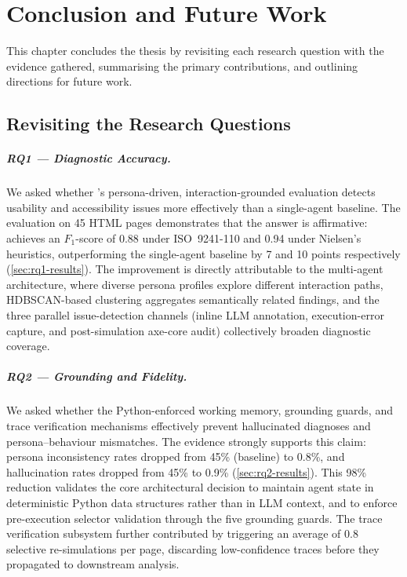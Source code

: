 \chapter{Conclusion and Future Work}
\label{ch:conclusion}

This chapter concludes the thesis by revisiting each research question with the evidence gathered, summarising the primary contributions, and outlining directions for future work.


\section{Revisiting the Research Questions}
\label{sec:rq-revisit}

\paragraph{RQ1 --- Diagnostic Accuracy.}
We asked whether \versimux{}'s persona-driven, interaction-grounded evaluation detects usability and accessibility issues more effectively than a single-agent baseline. The evaluation on 45 HTML pages demonstrates that the answer is affirmative: \versimux{} achieves an $F_1$-score of 0.88 under ISO~9241-110 and 0.94 under Nielsen's heuristics, outperforming the single-agent baseline by 7 and 10 points respectively (\cref{sec:rq1-results}). The improvement is directly attributable to the multi-agent architecture, where diverse persona profiles explore different interaction paths, HDBSCAN-based clustering aggregates semantically related findings, and the three parallel issue-detection channels (inline LLM annotation, execution-error capture, and post-simulation axe-core audit) collectively broaden diagnostic coverage.

\paragraph{RQ2 --- Grounding and Fidelity.}
We asked whether the Python-enforced working memory, grounding guards, and trace verification mechanisms effectively prevent hallucinated diagnoses and persona--behaviour mismatches. The evidence strongly supports this claim: persona inconsistency rates dropped from 45\% (baseline) to 0.8\%, and hallucination rates dropped from 45\% to 0.9\% (\cref{sec:rq2-results}). This 98\% reduction validates the core architectural decision to maintain agent state in deterministic Python data structures rather than in LLM context, and to enforce pre-execution selector validation through the five grounding guards. The trace verification subsystem further contributed by triggering an average of 0.8 selective re-simulations per page, discarding low-confidence traces before they propagated to downstream analysis.

